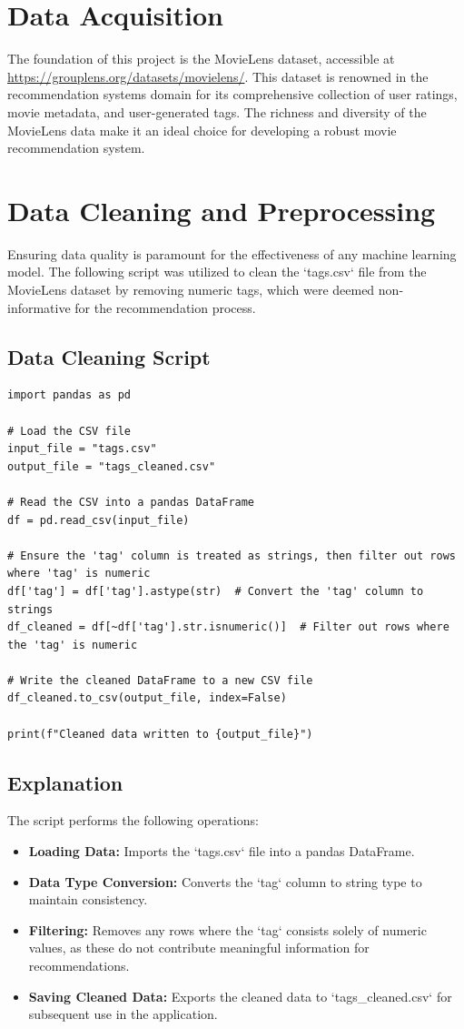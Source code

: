 \documentclass[conference]{IEEEtran}
\begin{document}
\section{Data Acquisition}
The foundation of this project is the MovieLens dataset, accessible at \url{https://grouplens.org/datasets/movielens/}. This dataset is renowned in the recommendation systems domain for its comprehensive collection of user ratings, movie metadata, and user-generated tags. The richness and diversity of the MovieLens data make it an ideal choice for developing a robust movie recommendation system.

\section{Data Cleaning and Preprocessing}
Ensuring data quality is paramount for the effectiveness of any machine learning model. The following script was utilized to clean the `tags.csv` file from the MovieLens dataset by removing numeric tags, which were deemed non-informative for the recommendation process.

\subsection{Data Cleaning Script}
\begin{lstlisting}
import pandas as pd

# Load the CSV file
input_file = "tags.csv"
output_file = "tags_cleaned.csv"

# Read the CSV into a pandas DataFrame
df = pd.read_csv(input_file)

# Ensure the 'tag' column is treated as strings, then filter out rows where 'tag' is numeric
df['tag'] = df['tag'].astype(str)  # Convert the 'tag' column to strings
df_cleaned = df[~df['tag'].str.isnumeric()]  # Filter out rows where the 'tag' is numeric

# Write the cleaned DataFrame to a new CSV file
df_cleaned.to_csv(output_file, index=False)

print(f"Cleaned data written to {output_file}")
\end{lstlisting}

\subsection{Explanation}
The script performs the following operations:
\begin{itemize}
    \item \textbf{Loading Data:} Imports the `tags.csv` file into a pandas DataFrame.
    \item \textbf{Data Type Conversion:} Converts the `tag` column to string type to maintain consistency.
    \item \textbf{Filtering:} Removes any rows where the `tag` consists solely of numeric values, as these do not contribute meaningful information for recommendations.
    \item \textbf{Saving Cleaned Data:} Exports the cleaned data to `tags\_cleaned.csv` for subsequent use in the application.
\end{itemize}
\end{document}
